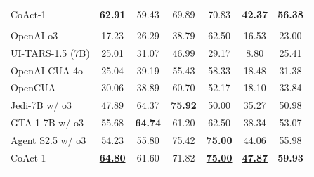 \documentclass{article} %
\newcommand{\ours}{CoAct-1\xspace}
\newcommand{\best}[1]{\underline{#1}}
\begin{document}
\begin{table}[t]
{\begin{tabular}{lccccccccccc}
\ours                    & \multicolumn{3}{c}{\textbf{62.91}}  & \multicolumn{3}{c}{59.43} & \multicolumn{2}{c}{69.89}                 & 70.83          & \textbf{42.37}         & \textbf{56.38}                    \\\rowcolor{gray!15}
\multicolumn{12}{c}{\textit{100 steps}}                                                                                                                                                                                                  \\
OpenAI o3                  & \multicolumn{3}{c}{17.23}           & \multicolumn{3}{c}{26.29}          & \multicolumn{2}{c}{38.79}                 & 62.50          & 16.53                  & 23.00                             \\
UI-TARS-1.5 (7B)             & \multicolumn{3}{c}{25.01}           & \multicolumn{3}{c}{31.07}          & \multicolumn{2}{c}{46.99}                 & 29.17          & 8.80                  & 25.41                            \\
OpenAI CUA 4o              & \multicolumn{3}{c}{25.04}           & \multicolumn{3}{c}{39.19}          & \multicolumn{2}{c}{55.43}                 & 58.33          & 18.48                  & 31.38                             \\
OpenCUA              & \multicolumn{3}{c}{30.06}           & \multicolumn{3}{c}{38.89}          & \multicolumn{2}{c}{60.70}                 & 52.17          & 18.10                  & 33.84                             \\
Jedi-7B w/ o3              & \multicolumn{3}{c}{47.89}           & \multicolumn{3}{c}{64.37}          & \multicolumn{2}{c}{\textbf{75.92}}        & 50.00          & 35.27                  & 50.98                             \\
GTA-1-7B w/ o3             & \multicolumn{3}{c}{55.68}           & \multicolumn{3}{c}{\textbf{64.74}} & \multicolumn{2}{c}{61.20}                 & 62.50          & 38.34                  & 53.07                             \\
Agent S2.5 w/ o3           & \multicolumn{3}{c}{54.23}           & \multicolumn{3}{c}{55.80}          & \multicolumn{2}{c}{75.42}                 & \textbf{\best{75.00}}          & 44.06                  & 55.98                             \\\rowcolor[HTML]{DBFCDA} 
\ours                    & \multicolumn{3}{c}{\textbf{\best{64.80}}}  & \multicolumn{3}{c}{61.60}          & \multicolumn{2}{c}{71.82}                 & \textbf{\best{75.00}} & \textbf{\best{47.87}}         & \textbf{59.93}                             \\ \rowcolor{gray!15}

\end{tabular}}
\end{table}
\end{document}
